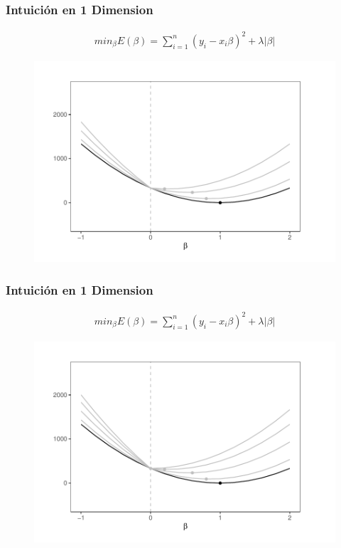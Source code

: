 \documentclass[
  shownotes,
  xcolor={svgnames},
  hyperref={colorlinks,citecolor=DarkBlue,linkcolor=DarkRed,urlcolor=DarkBlue}
  , aspectratio=169]{beamer}
\begin{document}
\begin{frame}[fragile]
\frametitle{Intuición en 1 Dimension}

\begin{align}
 min_{\beta} E(\beta) = \sum_{i=1}^n (y_i-x_i \beta)^2 + \lambda|\beta| 
\end{align}

   \begin{figure}[H] \centering
            \captionsetup{justification=centering}
              \includegraphics[scale=0.6]{figures/lasso4.pdf}
 \end{figure}





\end{frame}
\begin{frame}[fragile]
\frametitle{Intuición en 1 Dimension}

\begin{align}
 min_{\beta} E(\beta) = \sum_{i=1}^n (y_i-x_i \beta)^2 + \lambda|\beta| 
\end{align}

   \begin{figure}[H] \centering
            \captionsetup{justification=centering}
              \includegraphics[scale=0.6]{figures/lasso5.pdf}
 \end{figure}


\end{frame}
\end{document}
